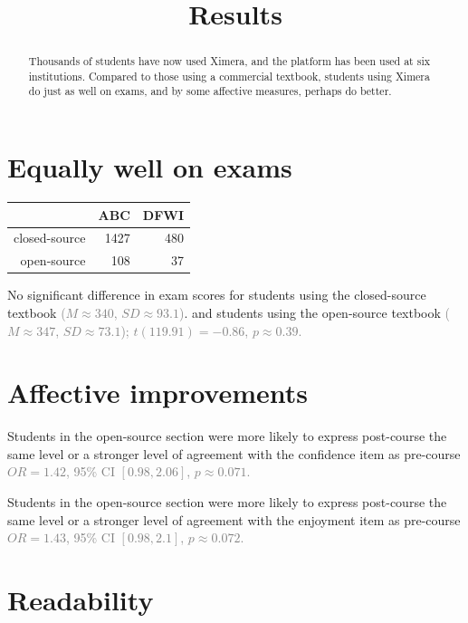 \documentclass{ximera}
\title{Results}
\begin{document}
\begin{abstract}
Thousands of students have now used Ximera, and the platform has been used at six institutions.  Compared to those using a commercial textbook, students using Ximera do just as well on exams, and by some affective measures, perhaps do better.
\end{abstract}
\maketitle

\section{Equally well on exams}

\begin{center}
  \begin{tabular}{rrr}
    \hline
    & ABC & DFWI \\ 
    \hline
    closed-source & 1427 & 480 \\ 
    open-source & 108 &  37 \\ 
    \hline
  \end{tabular}
\end{center}
    
No significant difference in exam scores for students using the
closed-source textbook \textcolor{gray}{(\(M \approx 340\),
  \(SD \approx 93.1\))}.  and students using the open-source textbook
\textcolor{gray}{(\(M \approx 347\), \(SD \approx 73.1\));}
\textcolor{gray}{\(t( 119.91 ) = -0.86\), \(p\approx 0.39\).}

\section{Affective improvements}

Students in the open-source section were more likely to express
post-course the same level or a stronger level of agreement with the
confidence item as pre-course \textcolor{gray}{\(OR = 1.42\), 95\% CI
  \([ 0.98 , 2.06 ]\), \(p\approx 0.071\).}

Students in the open-source section were more likely to express
post-course the same level or a stronger level of agreement with the
enjoyment item as pre-course \textcolor{gray}{\(OR = 1.43\), 95\% CI
  \([ 0.98 , 2.1 ]\), \(p\approx 0.072\).}

\section{Readability}
\end{document}
